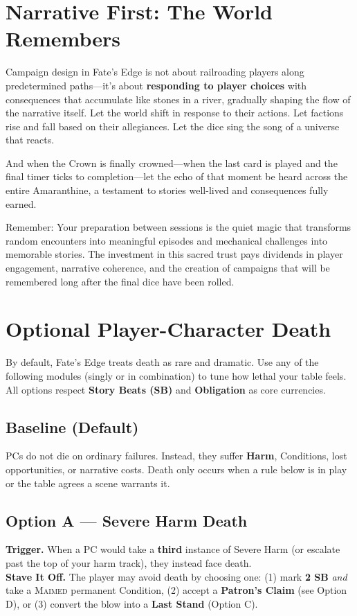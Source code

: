 \section{Narrative First: The World Remembers}
\label{sec:narrative-first}

Campaign design in Fate's Edge is not about railroading players along predetermined paths---it's about \textbf{responding to player choices} with consequences that accumulate like stones in a river, gradually shaping the flow of the narrative itself. Let the world shift in response to their actions. Let factions rise and fall based on their allegiances. Let the dice sing the song of a universe that reacts.

And when the Crown is finally crowned---when the last card is played and the final timer ticks to completion---let the echo of that moment be heard across the entire Amaranthine, a testament to stories well-lived and consequences fully earned.

Remember: Your preparation between sessions is the quiet magic that transforms random encounters into meaningful episodes and mechanical challenges into memorable stories. The investment in this sacred trust pays dividends in player engagement, narrative coherence, and the creation of campaigns that will be remembered long after the final dice have been rolled.

\section{Optional Player-Character Death}
\label{sec:pc-death-optional}

By default, Fate's Edge treats death as rare and dramatic. Use any of the following modules (singly or in combination) to tune how lethal your table feels. All options respect \textbf{Story Beats (SB)} and \textbf{Obligation} as core currencies.

\subsection*{Baseline (Default)}
PCs do not die on ordinary failures. Instead, they suffer \textbf{Harm}, Conditions, lost opportunities, or narrative costs. Death only occurs when a rule below is in play or the table agrees a scene warrants it.

\subsection*{Option A --- Severe Harm Death}
\textbf{Trigger.} When a PC would take a \textbf{third} instance of Severe Harm (or escalate past the top of your harm track), they instead face death.\\
\textbf{Stave It Off.} The player may avoid death by choosing one: (1) mark \textbf{2 SB} \emph{and} take a \textsc{Maimed} permanent Condition, (2) accept a \textbf{Patron's Claim} (see Option D), or (3) convert the blow into a \textbf{Last Stand} (Option C).

